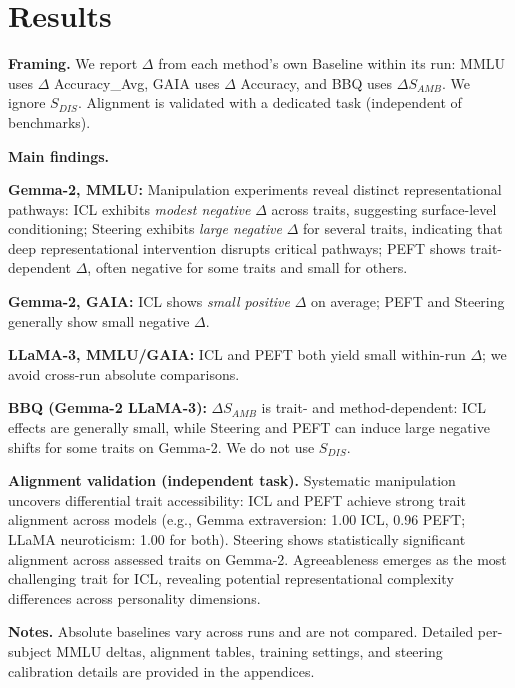 \section{Results}

\textbf{Framing.} We report \(\Delta\) from each method's own Baseline within its run: MMLU uses \(\Delta\) Accuracy\_Avg, GAIA uses \(\Delta\) Accuracy, and BBQ uses \(\Delta S_{AMB}\). We ignore \(S_{DIS}\). Alignment is validated with a dedicated task (independent of benchmarks).

\textbf{Main findings.}


\textbf{Gemma-2, MMLU:} Manipulation experiments reveal distinct representational pathways: ICL exhibits \emph{modest negative} \(\Delta\) across traits, suggesting surface-level conditioning; Steering exhibits \emph{large negative} \(\Delta\) for several traits, indicating that deep representational intervention disrupts critical pathways; PEFT shows trait-dependent \(\Delta\), often negative for some traits and small for others.


\textbf{Gemma-2, GAIA:} ICL shows \emph{small positive} \(\Delta\) on average; PEFT and Steering generally show small negative \(\Delta\).


\textbf{LLaMA-3, MMLU/GAIA:} ICL and PEFT both yield small within-run \(\Delta\); we avoid cross-run absolute comparisons.


\textbf{BBQ (Gemma-2 \/ LLaMA-3):} \(\Delta S_{AMB}\) is trait- and method-dependent: ICL effects are generally small, while Steering and PEFT can induce large negative shifts for some traits on Gemma-2. We do not use \(S_{DIS}\).

\textbf{Alignment validation (independent task).} Systematic manipulation uncovers differential trait accessibility: ICL and PEFT achieve strong trait alignment across models (e.g., Gemma extraversion: 1.00 ICL, 0.96 PEFT; LLaMA neuroticism: 1.00 for both). Steering shows statistically significant alignment across assessed traits on Gemma-2. Agreeableness emerges as the most challenging trait for ICL, revealing potential representational complexity differences across personality dimensions.


\textbf{Notes.} Absolute baselines vary across runs and are not compared. Detailed per-subject MMLU deltas, alignment tables, training settings, and steering calibration details are provided in the appendices.